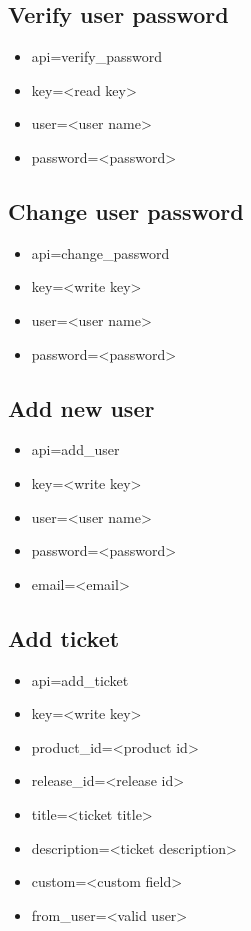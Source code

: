 \documentclass[11pt]{article}
\begin{document}
\subsection{Verify user password}

\begin{itemize}
\item api=verify\_password
\item key=<read key>
\item user=<user name>
\item password=<password>
\end{itemize}

\subsection{Change user password}

\begin{itemize}
\item api=change\_password
\item key=<write key>
\item user=<user name>
\item password=<password>
\end{itemize}

\subsection{Add new user}

\begin{itemize}
\item api=add\_user
\item key=<write key>
\item user=<user name>
\item password=<password>
\item email=<email>
\end{itemize}

\subsection{Add ticket}

\begin{itemize}
\item api=add\_ticket
\item key=<write key>
\item product\_id=<product id>
\item release\_id=<release id>
\item title=<ticket title>
\item description=<ticket description>
\item custom=<custom field>
\item from\_user=<valid user>
\end{itemize}
\end{document}
